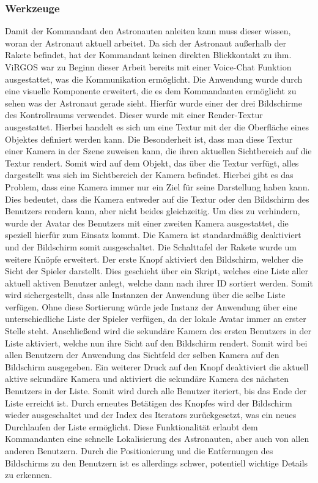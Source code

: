 \subsubsection{Werkzeuge}
Damit der Kommandant den Astronauten anleiten kann muss dieser wissen, woran der Astronaut aktuell arbeitet. Da sich der Astronaut außerhalb der Rakete befindet, hat der Kommandant keinen direkten Blickkontakt zu ihm. ViRGOS war zu Beginn dieser Arbeit bereits mit einer Voice-Chat Funktion ausgestattet, was die Kommunikation ermöglicht. Die Anwendung wurde durch eine visuelle Komponente erweitert, die es dem Kommandanten ermöglicht zu sehen was der Astronaut gerade sieht. Hierfür wurde einer der drei Bildschirme des Kontrollraums verwendet. Dieser wurde mit einer Render-Textur ausgestattet. Hierbei handelt es sich um eine Textur mit der die Oberfläche eines Objektes definiert werden kann. Die Besonderheit ist, dass man diese Textur einer Kamera in der Szene zuweisen kann, die ihren aktuellen Sichtbereich auf die Textur rendert. Somit wird auf dem Objekt, das über die Textur verfügt, alles dargestellt was sich im Sichtbereich der Kamera befindet. Hierbei gibt es das Problem, dass eine Kamera immer nur ein Ziel für seine Darstellung haben kann. Dies bedeutet, dass die Kamera entweder auf die Textur oder den Bildschirm des Benutzers rendern kann, aber nicht beides gleichzeitig. Um dies zu verhindern, wurde der Avatar des Benutzers mit einer zweiten Kamera ausgestattet, die speziell hierfür zum Einsatz kommt. Die Kamera ist standardmäßig deaktiviert und der Bildschirm somit ausgeschaltet. Die Schalttafel der Rakete wurde um weitere Knöpfe erweitert. Der erste Knopf aktiviert den Bildschirm, welcher die Sicht der Spieler darstellt. Dies geschieht über ein Skript, welches eine Liste aller aktuell aktiven Benutzer anlegt, welche dann nach ihrer ID sortiert werden. Somit wird sichergestellt, dass alle Instanzen der Anwendung über die selbe Liste verfügen. Ohne diese Sortierung würde jede Instanz der Anwendung über eine unterschiedliche Liste der Spieler verfügen, da der lokale Avatar immer an erster Stelle steht. Anschließend wird die sekundäre Kamera des ersten Benutzers in der Liste aktiviert, welche nun ihre Sicht auf den Bildschirm rendert. Somit wird bei allen Benutzern der Anwendung das Sichtfeld der selben Kamera auf den Bildschirm ausgegeben. Ein weiterer Druck auf den Knopf deaktiviert die aktuell aktive sekundäre Kamera und aktiviert die sekundäre Kamera des nächsten Benutzers in der Liste. Somit wird durch alle Benutzer iteriert, bis das Ende der Liste erreicht ist. Durch erneutes Betätigen des Knopfes wird der Bildschirm wieder ausgeschaltet und der Index des Iterators zurückgesetzt, was ein neues Durchlaufen der Liste ermöglicht. Diese Funktionalität erlaubt dem Kommandanten eine schnelle Lokalisierung des Astronauten, aber auch von allen anderen Benutzern. Durch die Positionierung und die Entfernungen des Bildschirms zu den Benutzern ist es allerdings schwer, potentiell wichtige Details zu erkennen.\newline

